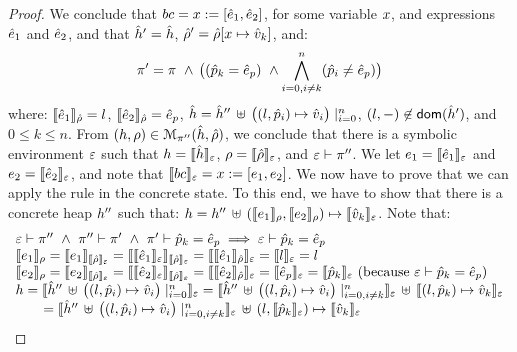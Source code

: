 \begin{proof}
\noindent{}
We conclude that $\bcmd = \jvar := [\sexpr_1, \sexpr_2]$, for some variable $\jvar$, and expressions $\sexpr_1$ and $\sexpr_2$, 
and that $\sheap' = \sheap$, $\sstore' = \sstore[\jvar \mapsto \sexprv_k]$, and: 
 $$\pc' =  \pc \ \wedge \, \big( (\sexprp_k = \sexpr_p) \ \wedge \bigwedge_{i = 0, i \neq k}^n (\sexprp_i \neq \sexpr_p) \big)$$
 where:
 $\symbeval{\sexpr_1}{\sstore} =  \loc$, $\symbeval{\sexpr_2}{\sstore} =  \sexpr_p$, 
 $\sheap = \sheap'' \, \uplus \, \big((l, \sexprp_i) \mapsto \sexprv_i\big)\mid_{i = 0}^n$, 
 $(l, -) \not\in \domain(\sheap')$, and $0 \leq k \leq n$. 
%
From $(\heap, \store) \in \smodels{\sheap, \sstore}{\pc''}$, we conclude that there is a symbolic environment
$\senv$ such that $\heap = \semexpr{\sheap}{\senv}$, $\store = \semexpr{\sstore}{\senv}$, and 
$\senv \vdash \pc''$. 
We let $\jsilexpr_1 = \symbeval{\sexpr_1}{\senv}$ and $\jsilexpr_2 = \symbeval{\sexpr_2}{\senv}$, and note that $\symbeval{\bcmd}{\senv} = \jvar := [\jsilexpr_1, \jsilexpr_2]$.
We now have to prove that we can apply the  rule in the concrete state.
To this end, we have to show that there is a concrete heap $\heap''$ such that:
$\heap = \heap'' \dunion \hcell{\symbeval{\jsilexpr_1}{\store}}{\symbeval{\jsilexpr_2}{\store}}{\symbeval{\sexprv_k}{\senv}}$. 
Note that: 
$$
\begin{array}{l}
%
\senv \vdash \pc'' \ \wedge \ \pc'' \vdash \pc' \ \wedge \ \pc' \vdash \sexprp_k = \sexpr_p \implies \senv \vdash \sexprp_k = \sexpr_p \\
%
 \symbeval{\jsilexpr_1}{\store} = \symbeval{\jsilexpr_1}{\symbeval{\sstore}{\senv}} = \symbeval{\symbeval{\sexpr_1}{\senv}}{\symbeval{\sstore}{\senv}} = \symbeval{\symbeval{\sexpr_1}{\sstore}}{\senv} 
    = \symbeval{\loc}{\senv} = \loc \\ 
  \symbeval{\jsilexpr_2}{\store}  = \symbeval{\jsilexpr_2}{\semexpr{\sstore}{\senv}} =  \symbeval{\symbeval{\sexpr_2}{\senv}}{\symbeval{\sstore}{\senv}} = \symbeval{\symbeval{\sexpr_2}{\sstore}}{\senv}
   =  \symbeval{\sexpr_p}{\senv} = \symbeval{\sexprp_k}{\senv}  \text{ (because $\senv \vdash \sexprp_k = \sexpr_p$)} \\
 \heap = \semexpr{\sheap'' \, \uplus \, \big((l, \sexprp_i) \mapsto \sexprv_i\big)\mid_{i = 0}^n}{\senv} 
       =  \semexpr{\sheap'' \, \uplus \, \big((l, \sexprp_i) \mapsto \sexprv_i\big)\mid_{i = 0, i \neq k}^n}{\senv} \dunion \semexpr{(l, \sexprp_k) \mapsto \sexprv_k}{\senv} \\
         \qquad = \semexpr{\sheap'' \, \uplus \, \big((l, \sexprp_i) \mapsto \sexprv_i\big)\mid_{i = 0, i \neq k}^n}{\senv} \dunion (l, \semexpr{\sexprp_k}{\senv}) \mapsto \semexpr{\sexprv_k}{\senv}  \\ 

\end{array}$$
\end{proof}
